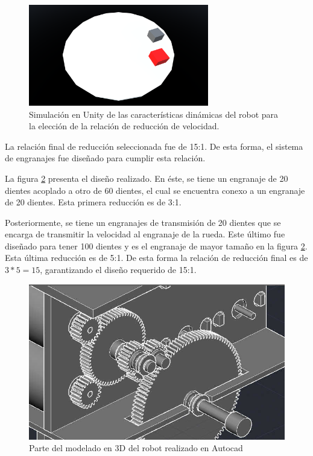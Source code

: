 \begin{figure}[H]
	\centering
	\includegraphics[width=0.7\textwidth]{imagenes/prototipo/SimulacionUnity}
	\caption[Simulación en Unity]{Simulación en Unity de las características dinámicas del robot para la elección de la relación de reducción de velocidad.}
	\label{imagen:prototipo/SimulacionUnity}
\end{figure}

La relación final de reducción seleccionada fue de  15:1. De esta forma, el sistema de engranajes fue diseñado para cumplir esta relación.

La figura \ref{imagen:disenoEngranajesAutocad} presenta el diseño realizado. En éste, se tiene un engranaje de 20 dientes acoplado a otro de 60 dientes, el cual se encuentra conexo a un engranaje de 20 dientes. Esta primera reducción es de 3:1.

Posteriormente, se tiene un engranajes de transmisión de 20 dientes que se encarga de transmitir la velocidad al engranaje de la rueda. Este último fue diseñado para tener 100 dientes y es el engranaje de mayor tamaño en la figura \ref{imagen:disenoEngranajesAutocad}. Esta última reducción es de 5:1. De esta forma la relación de reducción final es de $3*5 = 15$, garantizando el diseño requerido de 15:1.

\begin{figure}[H]
	\centering
	\includegraphics[width=0.7\linewidth]{imagenes/prototipo/EngranajesAutocad}
	\caption[Modelado 3D del prototipo]{Parte del modelado en 3D del robot realizado en Autocad}
	\label{imagen:disenoEngranajesAutocad}
\end{figure}


